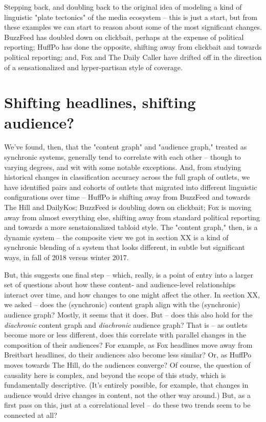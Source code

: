 \documentclass{scrartcl}
\begin{document}
Stepping back, and doubling back to the original idea of modeling a kind of linguistic "plate tectonics" of the media ecosystem -- this is just a start, but from these examples we can start to reason about some of the most significant changes. BuzzFeed has doubled down on clickbait, perhaps at the expense of political reporting; HuffPo has done the opposite, shifting away from clickbait and towards political reporting; and, Fox and The Daily Caller have drifted off in the direction of a sensationalized and hyper-partisan style of coverage.

\section{Shifting headlines, shifting audience?}

We've found, then, that the "content graph" and "audience graph," treated as synchronic systems, generally tend to correlate with each other -- though to varying degrees, and wit with some notable exceptions. And, from studying historical changes in classification accuracy across the full graph of outlets, we have identified pairs and cohorts of outlets that migrated into different linguistic configurations over time -- HuffPo is shifting away from BuzzFeed and towards The Hill and DailyKos; BuzzFeed is doubling down on clickbait; Fox is moving away from almost everything else, shifting away from standard political reporting and towards a more senstaionalized tabloid style. The "content graph," then, is a dynamic system -- the composite view we got in section XX is a kind of synchronic blending of a system that looks different, in subtle but significant ways, in fall of 2018 versus winter 2017.

But, this suggests one final step -- which, really, is a point of entry into a larger set of questions about how these content- and audience-level relationships interact over time, and how changes to one might affect the other. In section XX, we asked -- does the (synchronic) content graph align with the (synchronic) audience graph? Mostly, it seems that it does. But -- does this also hold for the \textit{diachronic} content graph and \textit{diachronic} audience graph? That is -- as outlets become more or less different, does this correlate with parallel changes in the composition of their audiences? For example, as Fox headlines move away from Breitbart headlines, do their audiences also become less similar? Or, as HuffPo moves towards The Hill, do the audiences converge? Of course, the question of causality here is complex, and beyond the scope of this study, which is fundamentally descriptive.  (It's entirely possible, for example, that changes in audience would drive changes in content, not the other way around.) But, as a first pass on this, just at a correlational level -- do these two trends seem to be connected at all?
\end{document}
